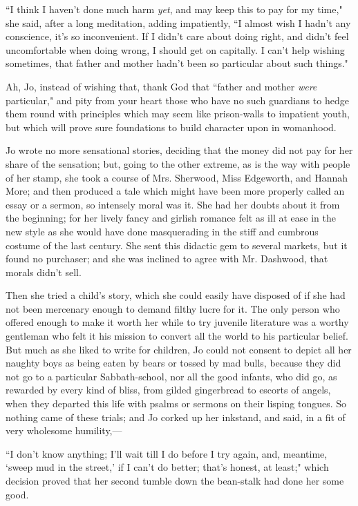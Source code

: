 ``I think I haven't done much harm \emph{yet}, and may
keep this to pay for my time," she said, after a long meditation, adding
impatiently, ``I almost wish I hadn't any conscience,
it's so inconvenient. If I didn't care
about doing right, and didn't feel uncomfortable when
doing wrong, I should get on capitally. I can't help
wishing sometimes, that father and mother hadn't been so
particular about such things."

Ah, Jo, instead of wishing that, thank God that ``father and mother
\emph{were} particular," and pity from your heart those who have no such
guardians to hedge them round with principles which may seem like
prison-walls to impatient youth, but which will prove sure foundations
to build character upon in womanhood.

Jo wrote no more sensational stories, deciding that the money did not
pay for her share of the sensation; but, going to the other extreme, as
is the way with people of her stamp, she took a course of Mrs. Sherwood,
Miss Edgeworth, and Hannah More; and then produced a tale which might
have been more properly called an essay or a sermon, so intensely moral
was it. She had her doubts about it from the beginning; for her lively
fancy and girlish romance felt as ill at ease in the new style as she
would have done masquerading in the stiff and cumbrous costume of the
last century. She sent this didactic gem to several markets, but it
found no purchaser; and she was inclined to agree with Mr. Dashwood,
that morals didn't sell.

Then she tried a child's story, which she could easily
have disposed of if she had not been mercenary enough to demand filthy
lucre for it. The only person who offered enough to make it worth her
while to try juvenile literature was a worthy gentleman who felt it his
mission to convert all the world to his particular belief. But much as
she liked to write for children, Jo could not consent to depict all her
naughty boys as being eaten by bears or tossed by mad bulls, because
they did not go to a particular Sabbath-school, nor all the good
infants, who did go, as rewarded by every kind of bliss, from gilded
gingerbread to escorts of angels, when they departed this life with
psalms or sermons on their lisping tongues. So nothing came of these
trials; and Jo corked up her inkstand, and said, in a fit of very
wholesome humility,---

``I don't know anything; I'll wait till I
do before I try again, and, meantime, `sweep mud in the
street,' if I can't do better;
that's honest, at least;" which decision proved that her
second tumble down the bean-stalk had done her some good.

